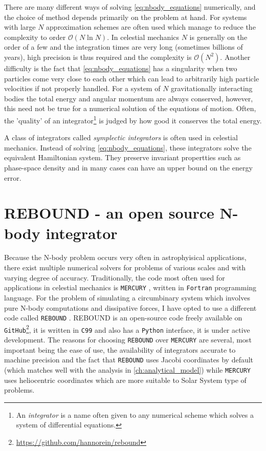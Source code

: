 \documentclass[ twoside,openright,titlepage,numbers=noenddot,headinclude,%
                footinclude=true,cleardoublepage=empty,abstractoff, %
                BCOR=5mm,paper=a4,fontsize=11pt,%
                american,%
                ]{scrreprt}
\begin{document}
There are many different ways of solving \cref{eq:nbody_equations} numerically,
and the choice of method depends primarily on the problem at hand. For systems
with large $N$
approximation schemes are often used which manage to reduce the complexity
to order $\mathcal{O}(N\ln N)$. In celestial mechanics $N$ is generally on
the order of a few and the integration times are very long (sometimes 
billions of years), high precision is thus required and the complexity is 
$\mathcal{O}(N^2)$. Another difficulty is the fact that \cref{eq:nbody_equations}
has a singularity when two particles come very close to each other which
can lead to arbitrarily high particle velocities if not properly handled.
For a system of $N$ gravitationally interacting bodies the total energy 
and angular momentum are always conserved, however, this need not be true 
for a numerical solution of the equations of motion. Often, the 'quality'
of an integrator\footnote{An \emph{integrator} is a name often given to
any numerical scheme which solves a system of differential equations.}
is judged by how good it conserves the total energy.

A class of integrators called \emph{symplectic integrators} 
\citep{vogelaere,ruth,feng} is often used
in celestial mechanics. Instead of solving \cref{eq:nbody_equations}, these
integrators solve the equivalent Hamiltonian system. They preserve
invariant propertties such as phase-space density and in many cases
can have an upper bound on the energy error.
\section{REBOUND - an open source N-body integrator}
\label{sec:REBOUND - an open source N-body integrator}
Because the N-body problem occurs very often in astrophyisical applications,
there exist multiple numerical solvers for problems of various scales and 
with varying degree of accuracy. Traditionally, the code most often used for applications
in celestial mechanics is \texttt{MERCURY} \citep{chambers1997,chambers1999}, 
written in \texttt{Fortran} programming language.
For the problem of simulating a circumbinary system
which involves pure N-body computations and dissipative forces, I have 
opted to use a different code called \texttt{REBOUND} \citep{Rein2012}.
REBOUND is an open-source code freely available on \texttt{GitHub}\footnote{
    \url{https://github.com/hannorein/rebound}}, it is written in \texttt{C99}
and also has a \texttt{Python} interface, it is under active development.
The reasons for choosing \texttt{REBOUND} over \texttt{MERCURY} are several,
most important being the ease of use, the availability of 
integrators accurate to machine precision  and the fact that 
\texttt{REBOUND} uses Jacobi coordinates
by default (which matches well with the analysis in \cref{ch:analytical_model})
while \texttt{MERCURY} uses heliocentric coordinates which are more suitable to
Solar System type of problems.
\end{document}
